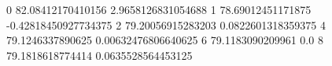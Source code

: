 0 82.08412170410156 2.9658126831054688
1 78.69012451171875 -0.42818450927734375
2 79.20056915283203 0.0822601318359375
4 79.1246337890625 0.00632476806640625
6 79.1183090209961 0.0
8 79.1818618774414 0.0635528564453125
